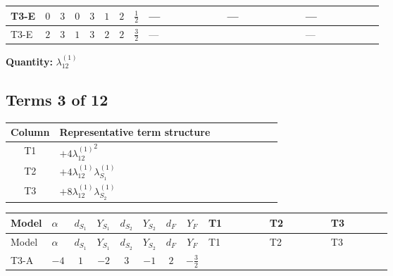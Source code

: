 \documentclass[8pt]{article}
\begin{document}
\begin{landscape}
\begin{longtable}{@{}llcccccc >{\raggedright\arraybackslash}p{0.21\linewidth} >{\raggedright\arraybackslash}p{0.21\linewidth} >{\raggedright\arraybackslash}p{0.21\linewidth}@{}}
\midrule
T3-E & $0$ & $3$ & $0$ & $3$ & $1$ & $2$ & $\frac{1}{2}$ & --- & --- & --- \\
\midrule
T3-E & $2$ & $3$ & $1$ & $3$ & $2$ & $2$ & $\frac{3}{2}$ & --- & \scriptsize\adjustbox{max width=\linewidth}{$\begin{gathered} +48 {g_1}^4\end{gathered}$} & --- \\
\midrule
\bottomrule
\end{longtable}
\clearpage
\noindent\textbf{Quantity: }$\lambda_{12}^{(1)}$\par\smallskip
\subsection*{Terms 3 of 12}
\begin{center}
\begin{tabular}{@{}c >{\raggedright\arraybackslash}p{0.82\linewidth}@{}}
\toprule
Column & Representative term structure \\
\midrule
T1 & \(\displaystyle +4 {\lambda_{12}^{(1)}}^2\) \\
\midrule
T2 & \(\displaystyle +4 {\lambda_{12}^{(1)}} {\lambda_{S_1}^{(1)}}\) \\
\midrule
T3 & \(\displaystyle +8 {\lambda_{12}^{(1)}} {\lambda_{S_2}^{(1)}}\) \\
\midrule
\bottomrule
\end{tabular}
\end{center}
\smallskip
\tiny
\begin{longtable}{@{}llcccccc >{\raggedright\arraybackslash}p{0.21\linewidth} >{\raggedright\arraybackslash}p{0.21\linewidth} >{\raggedright\arraybackslash}p{0.21\linewidth}@{}}
\toprule
Model & $\alpha$ & $d_{S_1}$ & $Y_{S_1}$ & $d_{S_2}$ & $Y_{S_2}$ & $d_F$ & $Y_F$ & T1 & T2 & T3 \\
\midrule
\endfirsthead
\toprule
Model & $\alpha$ & $d_{S_1}$ & $Y_{S_1}$ & $d_{S_2}$ & $Y_{S_2}$ & $d_F$ & $Y_F$ & T1 & T2 & T3 \\
\midrule
\endhead
T3-A & $-4$ & $1$ & $-2$ & $3$ & $-1$ & $2$ & $-\frac{3}{2}$ & \scriptsize\adjustbox{max width=\linewidth}{$\begin{gathered} +4 {\lambda_{12}^{(1)}}^2\end{gathered}$} & \scriptsize\adjustbox{max width=\linewidth}{$\begin{gathered} +4 {\lambda_{12}^{(1)}} {\lambda_{S_1}^{(1)}}\end{gathered}$} & \scriptsize\adjustbox{max width=\linewidth}{$\begin{gathered} +8 {\lambda_{12}^{(1)}} {\lambda_{S_2}^{(1)}}\end{gathered}$} \\

\end{longtable}
\end{landscape}
\end{document}
